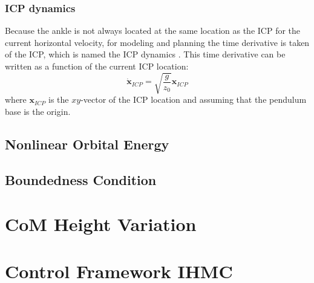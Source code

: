\subsubsection{\ac{ICP} dynamics}
Because the ankle is not always located at the same location as the \ac{ICP} for the current horizontal velocity, for modeling and planning the time derivative is taken of the \ac{ICP}, which is named the \ac{ICP} dynamics \cite{koolen2012capturability}. This time derivative can be written as a function of the current \ac{ICP} location:
\begin{equation}
\boldsymbol{\dot{x}}_{ICP}=\sqrt{ \frac{g}{z_0}}\boldsymbol{x}_{ICP} 
\label{eq:cp}
\end{equation}
where $\boldsymbol{x}_{ICP}$ is the $xy$-vector of the \ac{ICP} location and assuming that the pendulum base is the origin.

\subsection{Nonlinear Orbital Energy}
\Eorbit  \cite{pratt2007derivation}

\subsection{Boundedness Condition}
\section{CoM Height Variation}

\section{Control Framework IHMC}